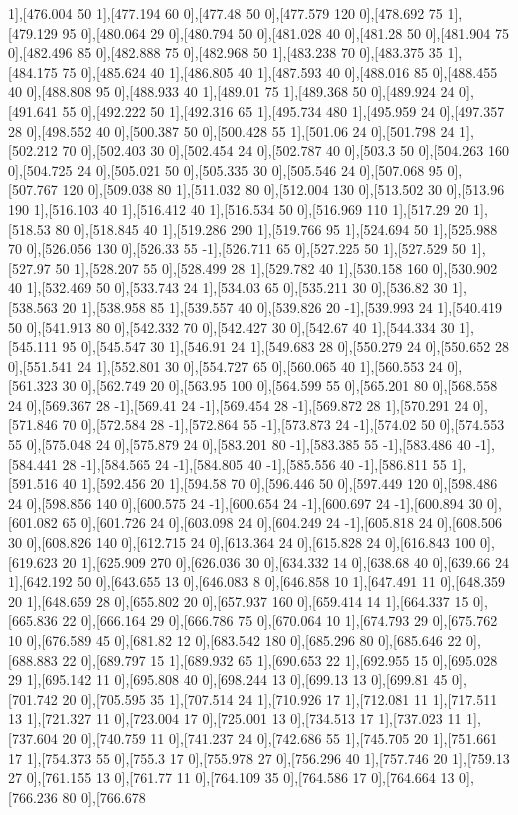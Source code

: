 {1],[476.004 50 1],[477.194 60 0],[477.48 50 0],[477.579 120 0],[478.692 75 1],[479.129 95 0],[480.064 29 0],[480.794 50 0],[481.028 40 0],[481.28 50 0],[481.904 75 0],[482.496 85 0],[482.888 75 0],[482.968 50 1],[483.238 70 0],[483.375 35 1],[484.175 75 0],[485.624 40 1],[486.805 40 1],[487.593 40 0],[488.016 85 0],[488.455 40 0],[488.808 95 0],[488.933 40 1],[489.01 75 1],[489.368 50 0],[489.924 24 0],[491.641 55 0],[492.222 50 1],[492.316 65 1],[495.734 480 1],[495.959 24 0],[497.357 28 0],[498.552 40 0],[500.387 50 0],[500.428 55 1],[501.06 24 0],[501.798 24 1],[502.212 70 0],[502.403 30 0],[502.454 24 0],[502.787 40 0],[503.3 50 0],[504.263 160 0],[504.725 24 0],[505.021 50 0],[505.335 30 0],[505.546 24 0],[507.068 95 0],[507.767 120 0],[509.038 80 1],[511.032 80 0],[512.004 130 0],[513.502 30 0],[513.96 190 1],[516.103 40 1],[516.412 40 1],[516.534 50 0],[516.969 110 1],[517.29 20 1],[518.53 80 0],[518.845 40 1],[519.286 290 1],[519.766 95 1],[524.694 50 1],[525.988 70 0],[526.056 130 0],[526.33 55 -1],[526.711 65 0],[527.225 50 1],[527.529 50 1],[527.97 50 1],[528.207 55 0],[528.499 28 1],[529.782 40 1],[530.158 160 0],[530.902 40 1],[532.469 50 0],[533.743 24 1],[534.03 65 0],[535.211 30 0],[536.82 30 1],[538.563 20 1],[538.958 85 1],[539.557 40 0],[539.826 20 -1],[539.993 24 1],[540.419 50 0],[541.913 80 0],[542.332 70 0],[542.427 30 0],[542.67 40 1],[544.334 30 1],[545.111 95 0],[545.547 30 1],[546.91 24 1],[549.683 28 0],[550.279 24 0],[550.652 28 0],[551.541 24 1],[552.801 30 0],[554.727 65 0],[560.065 40 1],[560.553 24 0],[561.323 30 0],[562.749 20 0],[563.95 100 0],[564.599 55 0],[565.201 80 0],[568.558 24 0],[569.367 28 -1],[569.41 24 -1],[569.454 28 -1],[569.872 28 1],[570.291 24 0],[571.846 70 0],[572.584 28 -1],[572.864 55 -1],[573.873 24 -1],[574.02 50 0],[574.553 55 0],[575.048 24 0],[575.879 24 0],[583.201 80 -1],[583.385 55 -1],[583.486 40 -1],[584.441 28 -1],[584.565 24 -1],[584.805 40 -1],[585.556 40 -1],[586.811 55 1],[591.516 40 1],[592.456 20 1],[594.58 70 0],[596.446 50 0],[597.449 120 0],[598.486 24 0],[598.856 140 0],[600.575 24 -1],[600.654 24 -1],[600.697 24 -1],[600.894 30 0],[601.082 65 0],[601.726 24 0],[603.098 24 0],[604.249 24 -1],[605.818 24 0],[608.506 30 0],[608.826 140 0],[612.715 24 0],[613.364 24 0],[615.828 24 0],[616.843 100 0],[619.623 20 1],[625.909 270 0],[626.036 30 0],[634.332 14 0],[638.68 40 0],[639.66 24 1],[642.192 50 0],[643.655 13 0],[646.083 8 0],[646.858 10 1],[647.491 11 0],[648.359 20 1],[648.659 28 0],[655.802 20 0],[657.937 160 0],[659.414 14 1],[664.337 15 0],[665.836 22 0],[666.164 29 0],[666.786 75 0],[670.064 10 1],[674.793 29 0],[675.762 10 0],[676.589 45 0],[681.82 12 0],[683.542 180 0],[685.296 80 0],[685.646 22 0],[688.883 22 0],[689.797 15 1],[689.932 65 1],[690.653 22 1],[692.955 15 0],[695.028 29 1],[695.142 11 0],[695.808 40 0],[698.244 13 0],[699.13 13 0],[699.81 45 0],[701.742 20 0],[705.595 35 1],[707.514 24 1],[710.926 17 1],[712.081 11 1],[717.511 13 1],[721.327 11 0],[723.004 17 0],[725.001 13 0],[734.513 17 1],[737.023 11 1],[737.604 20 0],[740.759 11 0],[741.237 24 0],[742.686 55 1],[745.705 20 1],[751.661 17 1],[754.373 55 0],[755.3 17 0],[755.978 27 0],[756.296 40 1],[757.746 20 1],[759.13 27 0],[761.155 13 0],[761.77 11 0],[764.109 35 0],[764.586 17 0],[764.664 13 0],[766.236 80 0],[766.678 }
